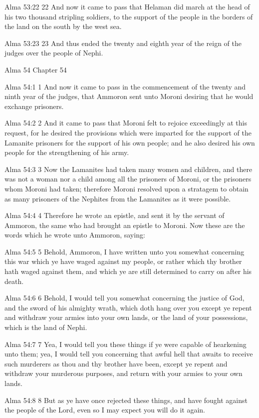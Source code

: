 Alma 53:22
 22 And now it came to pass that Helaman did march at the head of
his two thousand stripling soldiers, to the support of the people
in the borders of the land on the south by the west sea.

Alma 53:23
 23 And thus ended the twenty and eighth year of the reign of the
judges over the people of Nephi.

Alma 54
Chapter 54

Alma 54:1
 1 And now it came to pass in the commencement of the twenty and
ninth year of the judges, that Ammoron sent unto Moroni desiring
that he would exchange prisoners.

Alma 54:2
 2 And it came to pass that Moroni felt to rejoice exceedingly at
this request, for he desired the provisions which were imparted
for the support of the Lamanite prisoners for the support of his
own people; and he also desired his own people for the
strengthening of his army.

Alma 54:3
 3 Now the Lamanites had taken many women and children, and there
was not a woman nor a child among all the prisoners of Moroni, or
the prisoners whom Moroni had taken; therefore Moroni resolved
upon a stratagem to obtain as many prisoners of the Nephites from
the Lamanites as it were possible.

Alma 54:4
 4 Therefore he wrote an epistle, and sent it by the servant of
Ammoron, the same who had brought an epistle to Moroni. Now
these are the words which he wrote unto Ammoron, saying:

Alma 54:5
 5 Behold, Ammoron, I have written unto you somewhat concerning
this war which ye have waged against my people, or rather which
thy brother hath waged against them, and which ye are still
determined to carry on after his death.

Alma 54:6
 6 Behold, I would tell you somewhat concerning the justice of
God, and the sword of his almighty wrath, which doth hang over
you except ye repent and withdraw your armies into your own
lands, or the land of your possessions, which is the land of
Nephi.

Alma 54:7
 7 Yea, I would tell you these things if ye were capable of
hearkening unto them; yea, I would tell you concerning that awful
hell that awaits to receive such murderers as thou and thy
brother have been, except ye repent and withdraw your murderous
purposes, and return with your armies to your own lands.

Alma 54:8
 8 But as ye have once rejected these things, and have fought
against the people of the Lord, even so I may expect you will do
it again.

